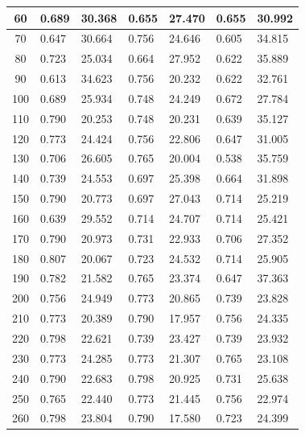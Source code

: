 \documentclass{report}
\begin{document}
\begin{minipage}{\textwidth}
\begin{longtable}{|c|l|l|l|l|l|l|}
                     60 & 0.689 & 30.368 & 0.655 & 27.470 & 0.655 & 30.992 \\ \hline
                     70 & 0.647 & 30.664 & 0.756 & 24.646 & 0.605 & 34.815 \\ \hline
                     80 & 0.723 & 25.034 & 0.664 & 27.952 & 0.622 & 35.889 \\ \hline
                     90 & 0.613 & 34.623 & 0.756 & 20.232 & 0.622 & 32.761 \\ \hline
                     100 & 0.689 & 25.934 & 0.748 & 24.249 & 0.672 & 27.784 \\ \hline
                     110 & 0.790 & 20.253 & 0.748 & 20.231 & 0.639 & 35.127 \\ \hline
                     120 & 0.773 & 24.424 & 0.756 & 22.806 & 0.647 & 31.005 \\ \hline
                     130 & 0.706 & 26.605 & 0.765 & 20.004 & 0.538 & 35.759 \\ \hline
                     140 & 0.739 & 24.553 & 0.697 & 25.398 & 0.664 & 31.898 \\ \hline
                     150 & 0.790 & 20.773 & 0.697 & 27.043 & 0.714 & 25.219 \\ \hline
                     160 & 0.639 & 29.552 & 0.714 & 24.707 & 0.714 & 25.421 \\ \hline
                     170 & 0.790 & 20.973 & 0.731 & 22.933 & 0.706 & 27.352 \\ \hline
                     180 & 0.807 & 20.067 & 0.723 & 24.532 & 0.714 & 25.905 \\ \hline
                     190 & 0.782 & 21.582 & 0.765 & 23.374 & 0.647 & 37.363 \\ \hline
                     200 & 0.756 & 24.949 & 0.773 & 20.865 & 0.739 & 23.828 \\ \hline
                     210 & 0.773 & 20.389 & 0.790 & 17.957 & 0.756 & 24.335 \\ \hline
                     220 & 0.798 & 22.621 & 0.739 & 23.427 & 0.739 & 23.932 \\ \hline
                     230 & 0.773 & 24.285 & 0.773 & 21.307 & 0.765 & 23.108 \\ \hline
                     240 & 0.790 & 22.683 & 0.798 & 20.925 & 0.731 & 25.638 \\ \hline
                     250 & 0.765 & 22.440 & 0.773 & 21.445 & 0.756 & 22.974 \\ \hline
                     260 & 0.798 & 23.804 & 0.790 & 17.580 & 0.723 & 24.399 \\ \hline

\end{longtable}
\end{minipage}
\end{document}
